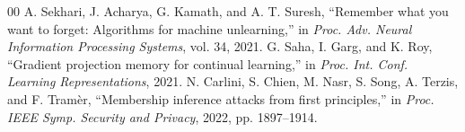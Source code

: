 \documentclass[conference]{IEEEtran}
\begin{document}
\begin{thebibliography}{00}
 A. Sekhari, J. Acharya, G. Kamath, and A. T. Suresh, ``Remember what you want to forget: Algorithms for machine unlearning,'' in \textit{Proc. Adv. Neural Information Processing Systems}, vol. 34, 2021.
 G. Saha, I. Garg, and K. Roy, ``Gradient projection memory for continual learning,'' in \textit{Proc. Int. Conf. Learning Representations}, 2021.
 N. Carlini, S. Chien, M. Nasr, S. Song, A. Terzis, and F. Tramèr, ``Membership inference attacks from first principles,'' in \textit{Proc. IEEE Symp. Security and Privacy}, 2022, pp. 1897--1914.
\end{thebibliography}
\end{document}
